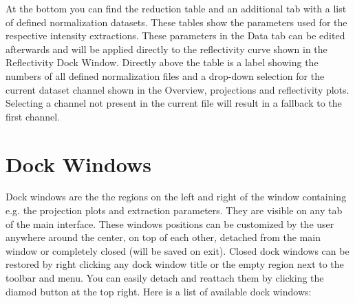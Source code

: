   At the bottom you can find the reduction table and an additional tab with a list of defined normalization datasets.
  These tables show the parameters used for the respective intensity extractions.
  These parameters in the Data tab can be edited afterwards and will be applied directly to the reflectivity curve shown in the Reflectivity Dock Window.
  Directly above the table is a label showing the numbers of all defined normalization files and a drop-down selection for the current dataset channel shown in the Overview, projections and reflectivity plots.
  Selecting a channel not present in the current file will result in a fallback to the first channel.
  
\section{Dock Windows}
  Dock windows are the the regions on the left and right of the window containing e.g. the projection plots and extraction parameters. They are visible on any tab of the main interface.
  These windows positions can be customized by the user anywhere around the center, on top of each other, detached from the main window or completely closed (will be saved on exit). Closed dock windows can be restored by right clicking any dock window title or the empty region next to the toolbar and menu. You can easily detach and reattach them by clicking the diamod button at the top right.
  Here is a list of available dock windows:
  
